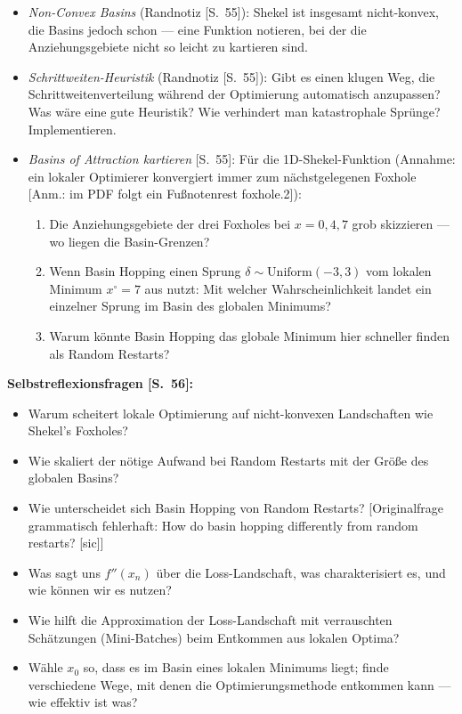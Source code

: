 \begin{itemize}[itemsep=2pt]
        erneut ansehen, die Anziehungsgebiete jedes lokalen Minimums markieren und
        ihre relativen Grö{\ss}en schätzen. Welches gehört zum globalen Minimum? Wie
        hängt das mit der Erfolgswahrscheinlichkeit von Random Restarts zusammen?
  \item \emph{Non-Convex Basins} (Randnotiz [S.~55]): Shekel ist insgesamt
        nicht-konvex, die Basins jedoch schon --- eine Funktion notieren, bei der die
        Anziehungsgebiete nicht so leicht zu kartieren sind.
  \item \emph{Schrittweiten-Heuristik} (Randnotiz [S.~55]): Gibt es einen klugen Weg,
        die Schrittweitenverteilung während der Optimierung automatisch anzupassen?
        Was wäre eine gute Heuristik? Wie verhindert man katastrophale Sprünge?
        Implementieren.
  \item \emph{Basins of Attraction kartieren} [S.~55]: Für die 1D-Shekel-Funktion
        (Annahme: ein lokaler Optimierer konvergiert immer zum nächstgelegenen
        Foxhole [Anm.: im PDF folgt ein Fu{\ss}notenrest \glqq foxhole.2\grqq]):
        \begin{enumerate}[label=(\alph*),itemsep=1pt]
          \item Die Anziehungsgebiete der drei Foxholes bei $x = 0, 4, 7$ grob
                skizzieren --- wo liegen die Basin-Grenzen?
          \item Wenn Basin Hopping einen Sprung $\delta \sim \mathrm{Uniform}(-3, 3)$
                vom lokalen Minimum $x^{\circ} = 7$ aus nutzt: Mit welcher
                Wahrscheinlichkeit landet ein einzelner Sprung im Basin des globalen
                Minimums?
          \item Warum könnte Basin Hopping das globale Minimum hier schneller finden
                als Random Restarts?
        \end{enumerate}
\end{itemize}

\textbf{Selbstreflexionsfragen [S.~56]:}
\begin{itemize}[itemsep=2pt]
  \item Warum scheitert lokale Optimierung auf nicht-konvexen Landschaften wie
        Shekel's Foxholes?
  \item Wie skaliert der nötige Aufwand bei Random Restarts mit der Grö{\ss}e des
        globalen Basins?
  \item Wie unterscheidet sich Basin Hopping von Random Restarts? [Originalfrage
        grammatisch fehlerhaft: \glqq How do basin hopping differently from random
        restarts?\grqq{} [sic]]
  \item Was sagt uns $f''(x_n)$ über die Loss-Landschaft, was charakterisiert es, und
        wie können wir es nutzen?
  \item Wie hilft die Approximation der Loss-Landschaft mit verrauschten Schätzungen
        (Mini-Batches) beim Entkommen aus lokalen Optima?
  \item Wähle $x_0$ so, dass es im Basin eines lokalen Minimums liegt; finde
        verschiedene Wege, mit denen die Optimierungsmethode entkommen kann --- wie
        effektiv ist was?
\end{itemize}

